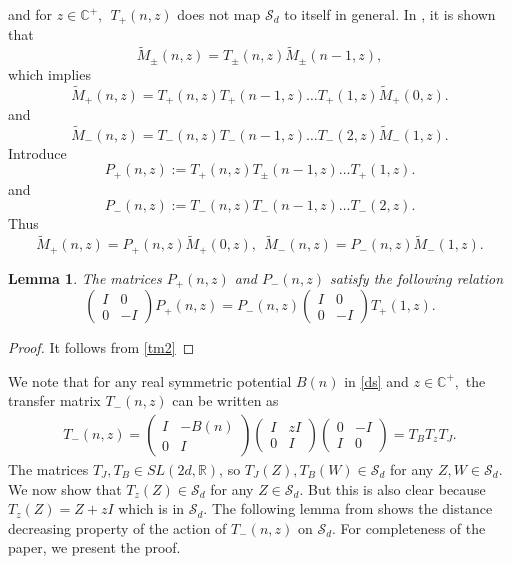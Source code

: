 \documentclass[reqno]{amsart}
\numberwithin{equation}{section}
\newcommand{\C}{\mathbb{C}}
\newcommand{\R}{\mathbb{R}}
\newtheorem{lemma}{Lemma}[section]
\begin{document}
and for $z\in \C^+, \ \ T_{+}(n, z) $ does not map $\mathcal S_d  $ to itself in general.
In \cite{KM}, it is shown that $$ \tilde M_{\pm}(n,z) = 	T_{\pm}(n,z)\tilde M_{\pm}(n-1,z) ,$$ which implies $$\tilde M_+ (n,z) =T_{+}(n,z)T_{+}(n-1,z) \dots T_{+}(1,z) \tilde M_+(0,z) .$$  and $$ \tilde M_- (n,z) =T_{-}(n,z)T_{-}(n-1,z) \dots T_{-}(2,z) \tilde M_-(1,z) .$$
 Introduce $$P_{+}(n,z):= T_{+}(n,z)T_{\pm}(n-1,z) \dots T_{+}(1,z).$$ and $$ P_-(n,z) := T_{-}(n,z)T_{-}(n-1,z) \dots T_{-}(2,z).$$ Thus  \begin{equation} \label{eq 4.14}  \tilde  M_+ (n,z) =P_{+}(n,z) \tilde M_+(0,z), \    \ \tilde M_- (n,z) =P_{-}(n,z) \tilde M_-(1,z)    
 .\end{equation}
\begin{lemma} \label{lemma4.9}The matrices $P_{+}(n,z) $ and $P_{-}(n,z)$ satisfy the following relation
\begin{equation}\begin{pmatrix} I & 0 \\ 0 & -I \end{pmatrix}	P_{+}(n,z)  = P_{-}(n,z)  \begin{pmatrix} I & 0 \\ 0 & -I \end{pmatrix} T_{+}(1,z)  .\end{equation}\end{lemma}

\begin{proof} It follows from \eqref{tm2}\end{proof}
 We note that for any real symmetric potential $B(n)$ in \eqref{ds} and $z\in \C^+,$ the transfer matrix $ T_{-}(n,z) $ can be written as     
    \begin{align*} T_{-}(n,z) =  \begin{pmatrix}  I  &   -B(n) \\ 0 &  I  \end{pmatrix} \begin{pmatrix} I &  zI \\ 0  & I \end{pmatrix}  \begin{pmatrix} 0 & -I \\ I  & 0 \end{pmatrix} = T_B  T_z T_J  .\end{align*} The matrices $ T_J,  T_B    \in SL(2d, \R) $, so $ T_J(Z), T_B(W) \in \mathcal S_d $ for any $ Z,  W \in \mathcal S_d .$ We now show that $T_z(Z) \in \mathcal S_d$ for any $ Z\in \mathcal S_d$. But this is also clear because $T_z (Z) =Z +zI $ which is in $\mathcal S_d .$ The following lemma from \cite{KM} shows the distance decreasing property of the action of $T_-(n,z)$ on $\mathcal S_d$. For completeness of the paper, we present the proof.
\end{document}
